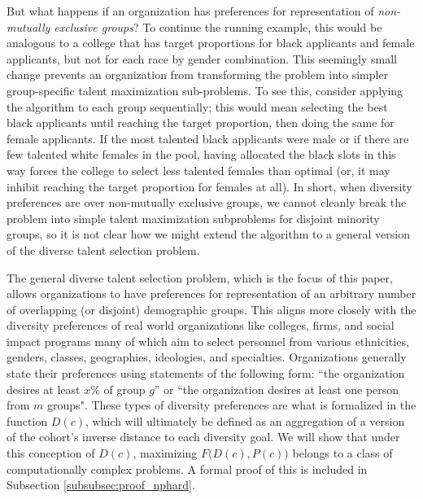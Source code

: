 But what happens if an organization has preferences for representation of \emph{non-mutually exclusive groups}? To continue the running example, this would be analogous to a college that has target proportions for black applicants and female applicants, but not for each race by gender combination. This seemingly small change prevents an organization from transforming the problem into simpler group-specific talent maximization sub-problems. To see this, consider applying the \textcite{kleinberg2018algorithmic} algorithm to each group sequentially; this would mean selecting the best black applicants until reaching the target proportion, then doing the same for female applicants. If the most talented black applicants were male or if there are few talented white females in the pool, having allocated the black slots in this way forces the college to select less talented females than optimal (or, it may inhibit reaching the target proportion for females at all). In short, when diversity preferences are over non-mutually exclusive groups, we cannot cleanly break the problem into simple talent maximization subproblems for disjoint minority groups, so it is not clear how we might extend the \textcite{kleinberg2018algorithmic} algorithm to a general version of the diverse talent selection problem. 

The general diverse talent selection problem, which is the focus of this paper, allows organizations to have preferences for representation of an arbitrary number of overlapping (or disjoint) demographic groups. This aligns more closely with the diversity preferences of real world organizations like colleges, firms, and social impact programs many of which aim to select personnel from various ethnicities, genders, classes, geographies, ideologies, and specialties. Organizations generally state their preferences using statements of the following form: ``the organization desires at least $x\%$ of group $g$'' or ``the organization desires at least one person from $m$ groups". These types of diversity preferences are what is formalized in the function $D(c)$, which will ultimately be defined as an aggregation of a version of the cohort's inverse distance to each diversity goal. We will show that under this conception of $D(c)$, maximizing $F\Big(D(c),P(c)\Big)$ belongs to a class of computationally complex problems. A formal proof of this is included in Subsection \ref{subsubsec:proof_nphard}.


